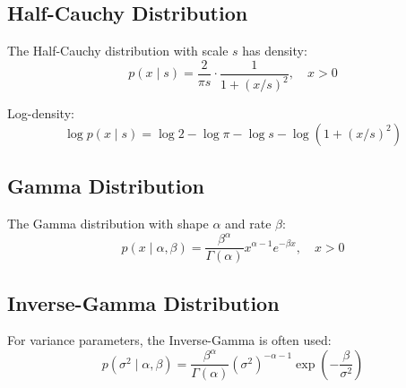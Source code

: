 \documentclass[11pt,a4paper]{article}
\theoremstyle{definition}
\begin{document}
\subsection{Half-Cauchy Distribution}

The Half-Cauchy distribution with scale $s$ has density:
\begin{equation}
    p(x \mid s) = \frac{2}{\pi s} \cdot \frac{1}{1 + (x/s)^2}, \quad x > 0
\end{equation}

Log-density:
\begin{equation}
    \log p(x \mid s) = \log 2 - \log \pi - \log s - \log\left(1 + (x/s)^2\right)
\end{equation}

\subsection{Gamma Distribution}

The Gamma distribution with shape $\alpha$ and rate $\beta$:
\begin{equation}
    p(x \mid \alpha, \beta) = \frac{\beta^\alpha}{\Gamma(\alpha)} x^{\alpha-1} e^{-\beta x}, \quad x > 0
\end{equation}

\subsection{Inverse-Gamma Distribution}

For variance parameters, the Inverse-Gamma is often used:
\begin{equation}
    p(\sigma^2 \mid \alpha, \beta) = \frac{\beta^\alpha}{\Gamma(\alpha)} (\sigma^2)^{-\alpha-1} \exp\left(-\frac{\beta}{\sigma^2}\right)
\end{equation}
\end{document}
